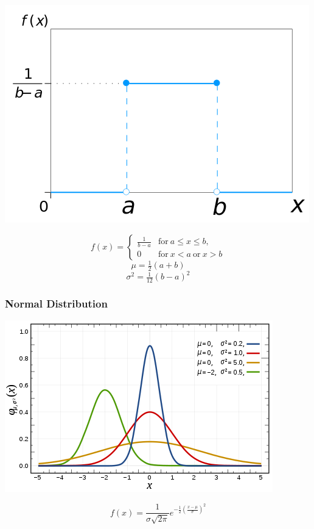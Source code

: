 \documentclass{article}
\begin{document}
\begin{center}
\includegraphics[scale=0.4]{./images/uniform_distribution_pdf.png}
\end{center}

\[
f(x) = 
\begin{cases}
\frac{1}{b-a} & \mathrm{for} \ a \leq x \leq b, \\
0 & \mathrm{for} \ x < a \ \mathrm{or} \ x > b
\end{cases}
\]
\[\mu = \tfrac{1}{2} (a + b)\]
\[\sigma^{2} = \tfrac{1}{12} (b - a)^{2}\]

\subsubsection{Normal Distribution}

\begin{center}
\includegraphics[scale=0.4]{./images/normal_distribution_pdf.png}
\end{center}

\[f(x) = \frac{1}{\sigma \sqrt{2\pi}} e^{-\frac{1}{2} (\frac{x - \mu}{\sigma })^{2}}\]

\printindex
\end{document}
